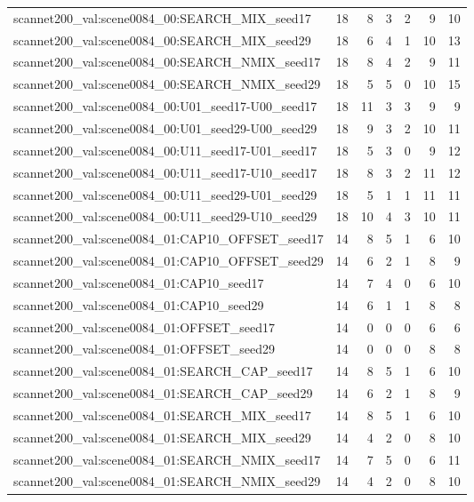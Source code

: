 \begin{table}[t]
\begin{tabular}{lrrrrrr}
scannet200\_val:scene0084\_00:SEARCH\_MIX\_seed17 & 18 & 8 & 3 & 2 & 9 & 10 \\
scannet200\_val:scene0084\_00:SEARCH\_MIX\_seed29 & 18 & 6 & 4 & 1 & 10 & 13 \\
scannet200\_val:scene0084\_00:SEARCH\_NMIX\_seed17 & 18 & 8 & 4 & 2 & 9 & 11 \\
scannet200\_val:scene0084\_00:SEARCH\_NMIX\_seed29 & 18 & 5 & 5 & 0 & 10 & 15 \\
scannet200\_val:scene0084\_00:U01\_seed17-U00\_seed17 & 18 & 11 & 3 & 3 & 9 & 9 \\
scannet200\_val:scene0084\_00:U01\_seed29-U00\_seed29 & 18 & 9 & 3 & 2 & 10 & 11 \\
scannet200\_val:scene0084\_00:U11\_seed17-U01\_seed17 & 18 & 5 & 3 & 0 & 9 & 12 \\
scannet200\_val:scene0084\_00:U11\_seed17-U10\_seed17 & 18 & 8 & 3 & 2 & 11 & 12 \\
scannet200\_val:scene0084\_00:U11\_seed29-U01\_seed29 & 18 & 5 & 1 & 1 & 11 & 11 \\
scannet200\_val:scene0084\_00:U11\_seed29-U10\_seed29 & 18 & 10 & 4 & 3 & 10 & 11 \\
scannet200\_val:scene0084\_01:CAP10\_OFFSET\_seed17 & 14 & 8 & 5 & 1 & 6 & 10 \\
scannet200\_val:scene0084\_01:CAP10\_OFFSET\_seed29 & 14 & 6 & 2 & 1 & 8 & 9 \\
scannet200\_val:scene0084\_01:CAP10\_seed17 & 14 & 7 & 4 & 0 & 6 & 10 \\
scannet200\_val:scene0084\_01:CAP10\_seed29 & 14 & 6 & 1 & 1 & 8 & 8 \\
scannet200\_val:scene0084\_01:OFFSET\_seed17 & 14 & 0 & 0 & 0 & 6 & 6 \\
scannet200\_val:scene0084\_01:OFFSET\_seed29 & 14 & 0 & 0 & 0 & 8 & 8 \\
scannet200\_val:scene0084\_01:SEARCH\_CAP\_seed17 & 14 & 8 & 5 & 1 & 6 & 10 \\
scannet200\_val:scene0084\_01:SEARCH\_CAP\_seed29 & 14 & 6 & 2 & 1 & 8 & 9 \\
scannet200\_val:scene0084\_01:SEARCH\_MIX\_seed17 & 14 & 8 & 5 & 1 & 6 & 10 \\
scannet200\_val:scene0084\_01:SEARCH\_MIX\_seed29 & 14 & 4 & 2 & 0 & 8 & 10 \\
scannet200\_val:scene0084\_01:SEARCH\_NMIX\_seed17 & 14 & 7 & 5 & 0 & 6 & 11 \\
scannet200\_val:scene0084\_01:SEARCH\_NMIX\_seed29 & 14 & 4 & 2 & 0 & 8 & 10 \\

\end{tabular}
\end{table}
